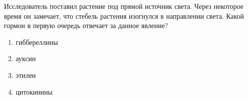 
Исследователь поставил растение под прямой источник света. Через некоторое время он замечает, что стебель растения изогнулся в направлении света. Какой гормон в первую очередь отвечает за данное явление?

\begin{enumerate}
    \item гиббереллины
    \item ауксин 
    \item этилен 
    \item цитокинины
\end{enumerate}

